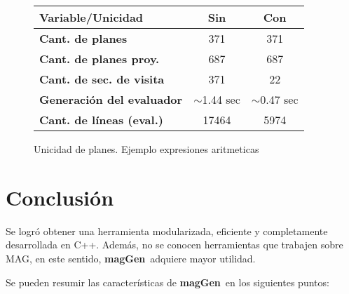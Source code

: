 \documentclass[runningheads,a4paper]{llncs}
\newcommand{\maggen}{\textbf{magGen}}
\begin{document}
\begin{figure}
    \vspace{-0.1cm}
    \begin{center}
        \setlength{\doublerulesep}{0mm}
        \setlength{\arrayrulewidth}{0.9pt}
        \begin{tabular}{|l||c|c|}
            \hline
            \rowcolor{gris} \textbf{Variable/Unicidad}&\textbf{Sin} & \textbf{Con} \\ \hline
            \rowcolor{white}\textbf{Cant. de planes}           & 371                        & 371                         \\ \hline
            \rowcolor{white}\textbf{Cant. de planes proy.}     & 687                        & 687                         \\ \hline
            \rowcolor{white}\textbf{Cant. de sec. de visita }  & \color{red}371             & \color{blue}22              \\ \hline
            \rowcolor{white}\textbf{Generación del evaluador}  & \color{red} $\sim$1.44 sec & \color{blue} $\sim$0.47 sec \\ \hline
            \rowcolor{white}\textbf{Cant. de líneas (eval.)}   & \color{red}17464           & \color{blue}5974            \\ \hline
        \end{tabular}
    \end{center}
    \vspace{-0,5cm}
    \caption{\label{fig:uni_plan}Unicidad de planes. Ejemplo expresiones aritmeticas}
\end{figure}

\section{Conclusión}
\vspace{-0.2cm}
Se logró obtener una herramienta modularizada, eficiente y completamente desarrollada en C++. Además, no se conocen herramientas que trabajen sobre MAG, en este sentido, \maggen\ adquiere mayor utilidad. 

Se pueden resumir las características de \maggen\ en los siguientes puntos:
\end{document}
